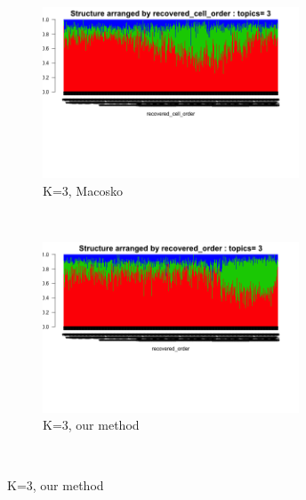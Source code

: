 \documentclass[11pt]{article}
\begin{document}
 
    
 \begin{figure}[ht]
    \centering    
     \begin{subfigure}[t]{0.5\textwidth}
        \centering
        \includegraphics[height=2in]{../figures/ipsc_structure_batchcorrect_cellcycle/clus_3/struct_clus_3_recovered_cell_order.png}
        \caption{K=3, Macosko}
    \end{subfigure}%
    ~
    \begin{subfigure}[t]{0.5\textwidth}
        \centering
        \includegraphics[height=2in]{../figures/ipsc_structure_batchcorrect_cellcycle/clus_3/struct_clus_3_recovered_order.png}
        \caption{K=3, our method}
    \end{subfigure}\\


\end{figure}
\end{document}
